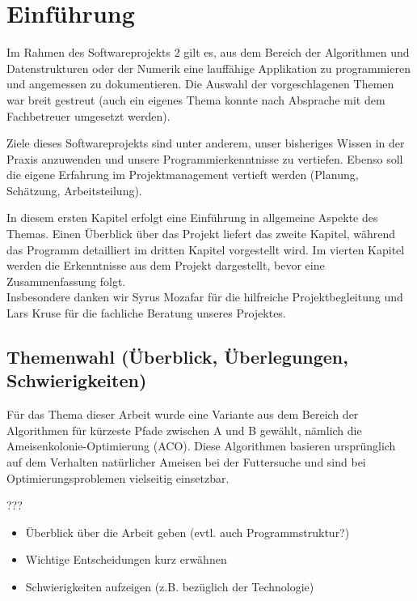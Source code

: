 




\chapter{Einführung}

Im Rahmen des Softwareprojekts 2 gilt es, aus dem Bereich der Algorithmen und Datenstrukturen oder der Numerik eine lauffähige Applikation zu programmieren und angemessen zu dokumentieren. Die Auswahl der vorgeschlagenen Themen war breit gestreut (auch ein eigenes Thema konnte nach Absprache mit dem Fachbetreuer umgesetzt werden).

Ziele dieses Softwareprojekts sind unter anderem, unser bisheriges Wissen in der Praxis anzuwenden und unsere Programmierkenntnisse zu vertiefen. Ebenso soll die eigene Erfahrung im   Projektmanagement vertieft werden (Planung, Schätzung, Arbeitsteilung).

In diesem ersten Kapitel erfolgt eine Einführung in allgemeine Aspekte des Themas. Einen Überblick über das Projekt liefert das zweite Kapitel, während das Programm detailliert im dritten Kapitel vorgestellt wird. Im vierten Kapitel werden die Erkenntnisse aus dem Projekt dargestellt, bevor eine Zusammenfassung folgt. \\

\noindent
Insbesondere danken wir Syrus Mozafar für die hilfreiche Projektbegleitung und Lars Kruse für die fachliche Beratung unseres Projektes.



\section{Themenwahl (Überblick, Überlegungen, Schwierigkeiten)}

Für das Thema dieser Arbeit wurde eine Variante aus dem Bereich der Algorithmen für kürzeste Pfade zwischen A und B gewählt, nämlich die Ameisenkolonie-Optimierung (ACO). Diese Algorithmen basieren ursprünglich auf dem Verhalten natürlicher Ameisen bei der Futtersuche und sind bei Optimierungsproblemen vielseitig einsetzbar.


???
\begin{itemize}[noitemsep]
\item Überblick über die Arbeit geben (evtl. auch Programmstruktur?)
\item Wichtige Entscheidungen kurz erwähnen
\item Schwierigkeiten aufzeigen (z.B. bezüglich der Technologie)
\end{itemize}



